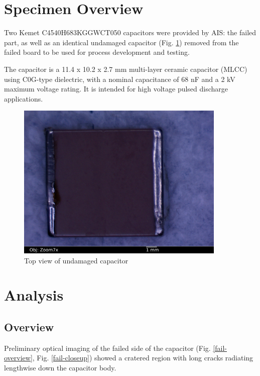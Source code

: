 \documentclass{article}
\begin{document}
\section{Specimen Overview}

Two Kemet C4540H683KGGWCT050 capacitors were provided by AIS: the failed part, as well as an identical undamaged
capacitor (Fig. \ref{overview}) removed from the failed board to be used for process development and testing.

The capacitor is a 11.4 x 10.2 x 2.7 mm multi-layer ceramic capacitor (MLCC) using C0G-type dielectric, with a nominal
capacitance of 68 nF and a 2 kV maximum voltage rating. It is intended for high voltage pulsed discharge applications.

\begin{figure}[h]
\includegraphics[width=10cm,keepaspectratio]{01-goodcap-top_annotated.jpg}
\caption{Top view of undamaged capacitor}
\label{overview}
\end{figure}

\pagebreak
\section{Analysis}

\subsection{Overview}

Preliminary optical imaging of the failed side of the capacitor (Fig. \ref{fail-overview}, Fig. \ref{fail-closeup})
showed a cratered region with long cracks radiating lengthwise down the capacitor body.
\end{document}
